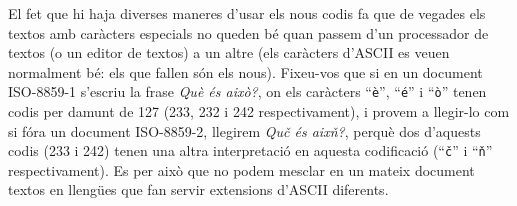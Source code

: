 El fet que hi haja diverses maneres d'usar els nous codis fa que de
vegades els textos amb caràcters especials no queden bé quan passem
d'un processador de textos (o un editor de textos) a un altre (els
caràcters d'ASCII es veuen normalment bé: els que fallen són els
nous). Fixeu-vos que si en un document ISO-8859-1 s'escriu la frase
\emph{Què és això?}, on els caràcters ``\texttt{è}'', ``\texttt{é}'' i
``\texttt{ò}'' tenen codis per damunt de 127 (233, 232 i 242
respectivament), i provem a llegir-lo com si fóra un document
ISO-8859-2, llegirem \emph{Quč és aixň?}, perquè dos d'aquests codis
(233 i 242) tenen una altra interpretació en aquesta codificació
(``\texttt{č}'' i ``\texttt{ň}'' respectivament). Es per això que no
podem mesclar en un mateix document textos en llengües que fan servir
extensions d'ASCII diferents.

